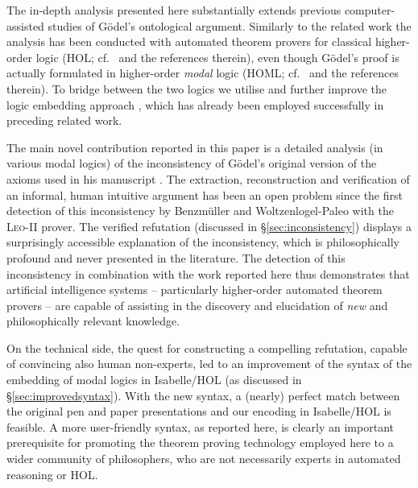\documentclass{article}
\begin{document}
The in-depth analysis presented here substantially
extends previous computer-assisted studies of G\"odel's ontological
argument. Similarly to the related work \cite{J30,C40} the analysis has
been conducted with automated theorem provers for classical
higher-order logic (HOL; cf.~\cite{andrewsSEP} and the references
therein), even though G\"odel's proof is actually formulated in
higher-order \emph{modal} logic (HOML; cf.~\cite{homl} and the
references therein). To bridge between the two logics we utilise and
further improve the logic embedding approach \cite{J23,C40}, which has
already been employed successfully in preceding related work.

The main novel contribution reported in this paper is a detailed
analysis (in various modal logics) of the inconsistency of G\"{o}del's
original version of the axioms used in his manuscript
. The extraction, reconstruction and
verification of an informal, human intuitive argument has been an open
problem since the first detection of this inconsistency by
Benzm\"uller and Woltzenlogel-Paleo  with the
\textsc{Leo-II} prover.  The verified refutation (discussed in
\S\ref{sec:inconsistency}) displays a surprisingly accessible
explanation of the inconsistency, which is philosophically profound
and never presented in the literature. The detection of this
inconsistency in combination with the work reported here thus
demonstrates that artificial intelligence systems -- particularly
higher-order automated theorem provers -- are capable of assisting in
the discovery and elucidation of \emph{new} and philosophically
relevant knowledge.

On the technical side, the quest for constructing a compelling
refutation, capable of convincing also human non-experts, led to an
improvement of the syntax of the embedding of modal logics in Isabelle/HOL
(as discussed in \S\ref{sec:improvedsyntax}). With the new syntax, a
(nearly) perfect match between the original pen and paper
presentations and our encoding in Isabelle/HOL is feasible. A more
user-friendly syntax, as reported here, is clearly an important
prerequisite for promoting the theorem proving technology employed
here to a wider community of philosophers, who are not necessarily
experts in automated reasoning or HOL.
\end{document}
